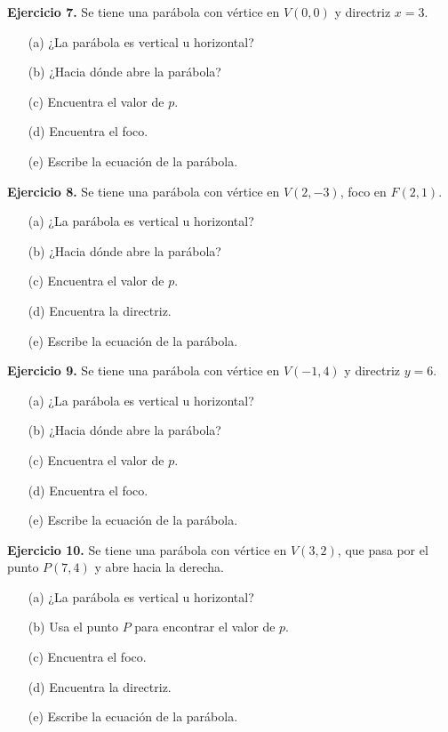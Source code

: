 \documentclass[12pt,a4paper]{article}
\begin{document}
	\bigskip

	\textbf{Ejercicio 7.} Se tiene una parábola con vértice en \(V(0,0)\) y directriz \(x=3\).
	\begin{itemize}
		\item[(a)] ¿La parábola es vertical u horizontal?
		\item[(b)] ¿Hacia dónde abre la parábola?
		\item[(c)] Encuentra el valor de \(p\).
		\item[(d)] Encuentra el foco.
		\item[(e)] Escribe la ecuación de la parábola.
	\end{itemize}

	\bigskip

	\textbf{Ejercicio 8.} Se tiene una parábola con vértice en \(V(2,-3)\), foco en \(F(2,1)\).
	\begin{itemize}
		\item[(a)] ¿La parábola es vertical u horizontal?
		\item[(b)] ¿Hacia dónde abre la parábola?
		\item[(c)] Encuentra el valor de \(p\).
		\item[(d)] Encuentra la directriz.
		\item[(e)] Escribe la ecuación de la parábola.
	\end{itemize}

	\bigskip

	\textbf{Ejercicio 9.} Se tiene una parábola con vértice en \(V(-1,4)\) y directriz \(y=6\).
	\begin{itemize}
		\item[(a)] ¿La parábola es vertical u horizontal?
		\item[(b)] ¿Hacia dónde abre la parábola?
		\item[(c)] Encuentra el valor de \(p\).
		\item[(d)] Encuentra el foco.
		\item[(e)] Escribe la ecuación de la parábola.
	\end{itemize}

	\bigskip

	\textbf{Ejercicio 10.} Se tiene una parábola con vértice en \(V(3,2)\), que pasa por el punto \(P(7,4)\) y abre hacia la derecha.
	\begin{itemize}
		\item[(a)] ¿La parábola es vertical u horizontal?
		\item[(b)] Usa el punto \(P\) para encontrar el valor de \(p\).
		\item[(c)] Encuentra el foco.
		\item[(d)] Encuentra la directriz.
		\item[(e)] Escribe la ecuación de la parábola.
	\end{itemize}
\end{document}
